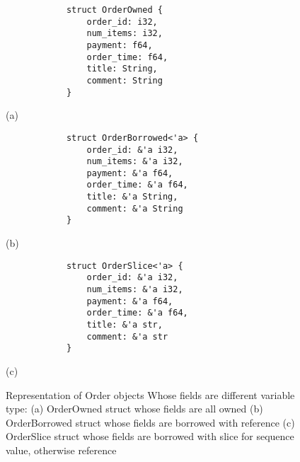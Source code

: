  \begin{figure}[htb]
    \begin{minipage}[t]{0.2\linewidth}\centering
        \begin{lstlisting}
            struct OrderOwned {
                order_id: i32,
                num_items: i32, 
                payment: f64,
                order_time: f64,
                title: String,
                comment: String
            } 
        \end{lstlisting}
      \medskip
      \centerline{(a)}
    \end{minipage}\hfill
    \begin{minipage}[t]{0.6\linewidth}\centering
        \begin{lstlisting}
            struct OrderBorrowed<'a> {
                order_id: &'a i32,
                num_items: &'a i32, 
                payment: &'a f64,
                order_time: &'a f64,
                title: &'a String,
                comment: &'a String
            }
        \end{lstlisting}
      \medskip
      \centerline{(b)}
    \end{minipage}
    \begin{minipage}[t]{0.2\linewidth}\centering
        \begin{lstlisting}
            struct OrderSlice<'a> {
                order_id: &'a i32,
                num_items: &'a i32, 
                payment: &'a f64,
                order_time: &'a f64,
                title: &'a str,
                comment: &'a str
            }
        \end{lstlisting}
      \medskip
      \centerline{(c)}
    \end{minipage}\hfill
    \caption{Representation of Order objects Whose fields are different variable type: (a) OrderOwned struct whose fields are all owned 
    (b) OrderBorrowed struct whose fields are borrowed with reference (c) OrderSlice struct whose fields are borrowed with slice for sequence value, otherwise reference}
    \label{fig:order}
 \end{figure}


